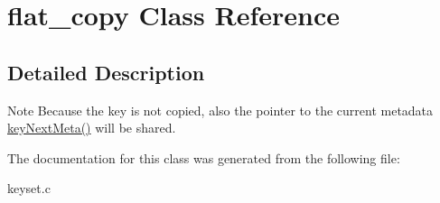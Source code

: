 \hypertarget{classflat__copy}{
\section{flat\_\-copy Class Reference}
\label{classflat__copy}
}


\subsection{Detailed Description}
\begin{DoxyNote}{Note}
Because the key is not copied, also the pointer to the current metadata \hyperlink{group__keymeta_ga4c88342f580a4291455a801af71ce048}{keyNextMeta()} will be shared. 
\end{DoxyNote}


The documentation for this class was generated from the following file:\begin{DoxyCompactItemize}
\item 
keyset.c\end{DoxyCompactItemize}
